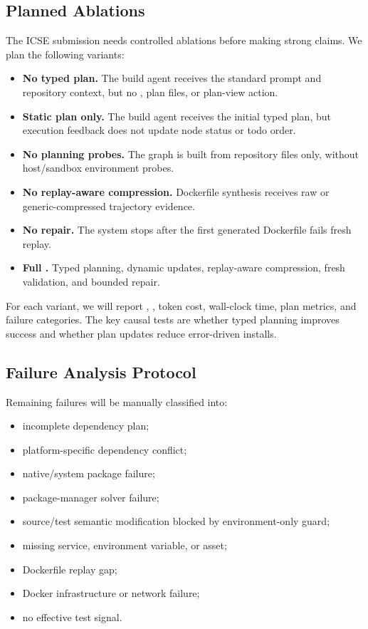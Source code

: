 \subsection{Planned Ablations}

The ICSE submission needs controlled ablations before making strong claims.
We plan the following variants:

\begin{itemize}[leftmargin=*]
  \item \textbf{No typed plan.} The build agent receives the standard prompt and repository context, but no \ttg, plan files, or plan-view action.
  \item \textbf{Static plan only.} The build agent receives the initial typed plan, but execution feedback does not update node status or todo order.
  \item \textbf{No planning probes.} The graph is built from repository files only, without host/sandbox environment probes.
  \item \textbf{No replay-aware compression.} Dockerfile synthesis receives raw or generic-compressed trajectory evidence.
  \item \textbf{No repair.} The system stops after the first generated Dockerfile fails fresh replay.
  \item \textbf{Full \tool.} Typed planning, dynamic updates, replay-aware compression, fresh validation, and bounded repair.
\end{itemize}

For each variant, we will report \dgsr, \ebsr, token cost, wall-clock time, plan metrics, and failure categories.
The key causal tests are whether typed planning improves success and whether plan updates reduce error-driven installs.

\subsection{Failure Analysis Protocol}

Remaining failures will be manually classified into:

\begin{itemize}[leftmargin=*]
  \item incomplete dependency plan;
  \item platform-specific dependency conflict;
  \item native/system package failure;
  \item package-manager solver failure;
  \item source/test semantic modification blocked by environment-only guard;
  \item missing service, environment variable, or asset;
  \item Dockerfile replay gap;
  \item Docker infrastructure or network failure;
  \item no effective test signal.
\end{itemize}


